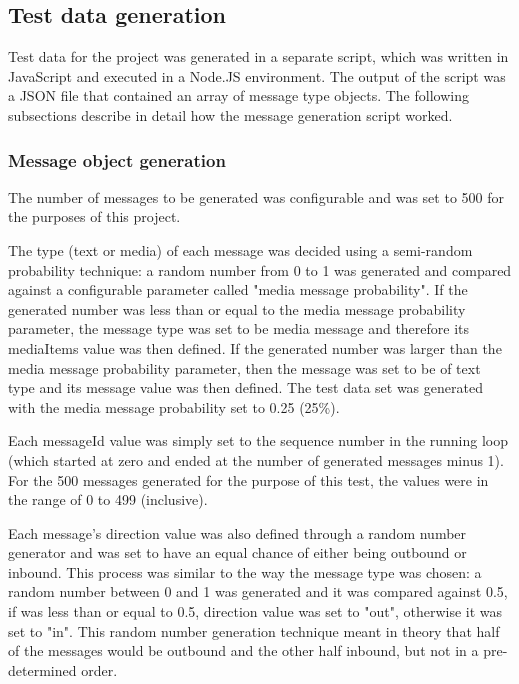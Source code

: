 \documentclass[a4paper,12pt]{article}
\begin{document}
\subsection{Test data generation}
\label{subsec:test-data-generation}
Test data for the project was generated in a separate script, which was written in JavaScript and executed in a Node.JS environment. The output of the script was a JSON file that contained an array of message type objects. The following subsections describe in detail how the message generation script worked.

\subsubsection{Message object generation}
The number of messages to be generated was configurable and was set to 500 for the purposes of this project.

The type (text or media) of each message was decided using a semi-random probability technique: a random number from 0 to 1 was generated and compared against a configurable parameter called "media message probability". If the generated number was less than or equal to the media message probability parameter, the message type was set to be media message and therefore its mediaItems value was then defined. If the generated number was larger than the media message probability parameter, then the message was set to be of text type and its message value was then defined. The test data set was generated with the media message probability set to 0.25 (25\%).

Each messageId value was simply set to the sequence number in the running loop (which started at zero and ended at the number of generated messages minus 1). For the 500 messages generated for the purpose of this test, the values were in the range of 0 to 499 (inclusive).

Each message's direction value was also defined through a random number generator and was set to have an equal chance of either being outbound or inbound. This process was similar to the way the message type was chosen: a random number between 0 and 1 was generated and it was compared against 0.5, if was less than or equal to 0.5, direction value was set to "out", otherwise it was set to "in". This random number generation technique meant in theory that half of the messages would be outbound and the other half inbound, but not in a pre-determined order.
\end{document}
